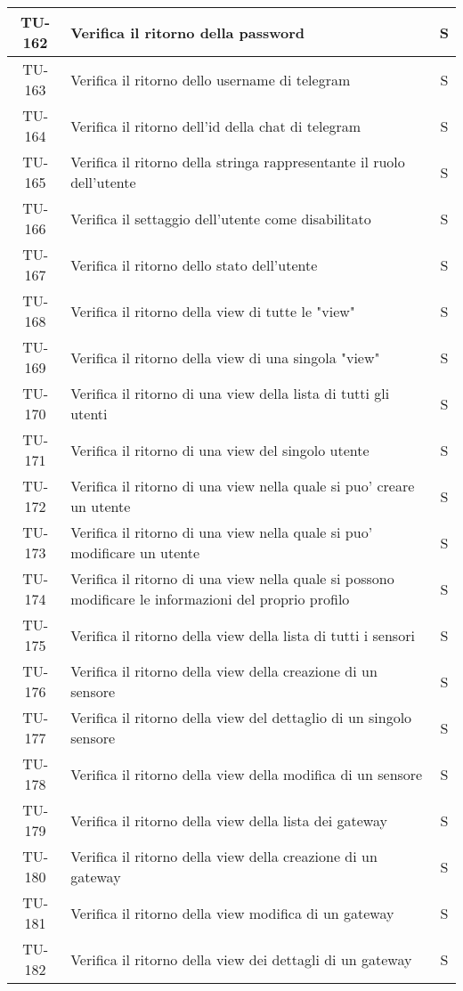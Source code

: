 \begin{center}
\begin{longtable}{|c|p{12cm}|c|}
			\hline
			TU-162 & Verifica il ritorno della password & S \\
			\hline
			TU-163 & Verifica il ritorno dello username di telegram & S \\
			\hline
			TU-164 & Verifica il ritorno dell'id della chat di telegram & S \\
			\hline
			TU-165 & Verifica il ritorno della stringa rappresentante il ruolo dell'utente & S \\
			\hline
			TU-166 & Verifica il settaggio dell'utente come disabilitato & S \\
			\hline
			TU-167 & Verifica il ritorno dello stato dell'utente & S \\
			\hline
			TU-168 & Verifica il ritorno della view di tutte le "view" & S \\
			\hline
			TU-169 & Verifica il ritorno della view di una singola "view" & S \\
			\hline
			TU-170 & Verifica il ritorno di una view della lista di tutti gli utenti & S \\
			\hline
			TU-171 & Verifica il ritorno di una view del singolo utente & S \\
			\hline
			TU-172 & Verifica il ritorno di una view nella quale si puo' creare un utente & S \\
			\hline
			TU-173 & Verifica il ritorno di una view nella quale si puo' modificare un utente & S \\
			\hline
			TU-174 & Verifica il ritorno di una view nella quale si possono modificare le informazioni del proprio profilo & S \\
			\hline
			TU-175 & Verifica il ritorno della view della lista di tutti i sensori & S \\
			\hline
			TU-176 & Verifica il ritorno della view della creazione di un sensore & S \\
			\hline
			TU-177 & Verifica il ritorno della view del dettaglio di un singolo sensore & S \\
			\hline
			TU-178 & Verifica il ritorno della view della modifica di un sensore & S \\
			\hline
			TU-179 & Verifica il ritorno della view della lista dei gateway & S \\
			\hline
			TU-180 & Verifica il ritorno della view della creazione di un gateway & S \\
			\hline
			TU-181 & Verifica il ritorno della view modifica di un gateway & S \\
			\hline
			TU-182 & Verifica il ritorno della view dei dettagli di un gateway & S \\

\end{longtable}
\end{center}
